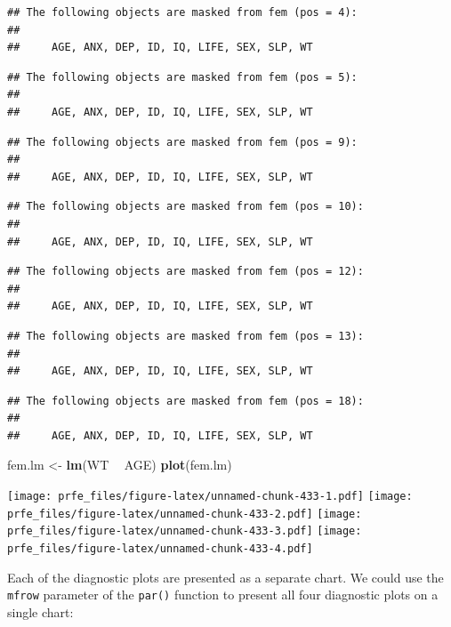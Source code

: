 \documentclass[12pt,a4paper]{book}
\newenvironment{Shaded}{\begin{snugshade}}{\end{snugshade}}
\newcommand{\KeywordTok}[1]{\textcolor[rgb]{0.13,0.29,0.53}{\textbf{#1}}}
\newcommand{\StringTok}[1]{\textcolor[rgb]{0.31,0.60,0.02}{#1}}
\newcommand{\OperatorTok}[1]{\textcolor[rgb]{0.81,0.36,0.00}{\textbf{#1}}}
\newcommand{\NormalTok}[1]{#1}
\theoremstyle{definition}
\theoremstyle{definition}
\theoremstyle{definition}
\theoremstyle{remark}
\begin{document}
\begin{verbatim}
## The following objects are masked from fem (pos = 4):
## 
##     AGE, ANX, DEP, ID, IQ, LIFE, SEX, SLP, WT
\end{verbatim}

\begin{verbatim}
## The following objects are masked from fem (pos = 5):
## 
##     AGE, ANX, DEP, ID, IQ, LIFE, SEX, SLP, WT
\end{verbatim}

\begin{verbatim}
## The following objects are masked from fem (pos = 9):
## 
##     AGE, ANX, DEP, ID, IQ, LIFE, SEX, SLP, WT
\end{verbatim}

\begin{verbatim}
## The following objects are masked from fem (pos = 10):
## 
##     AGE, ANX, DEP, ID, IQ, LIFE, SEX, SLP, WT
\end{verbatim}

\begin{verbatim}
## The following objects are masked from fem (pos = 12):
## 
##     AGE, ANX, DEP, ID, IQ, LIFE, SEX, SLP, WT
\end{verbatim}

\begin{verbatim}
## The following objects are masked from fem (pos = 13):
## 
##     AGE, ANX, DEP, ID, IQ, LIFE, SEX, SLP, WT
\end{verbatim}

\begin{verbatim}
## The following objects are masked from fem (pos = 18):
## 
##     AGE, ANX, DEP, ID, IQ, LIFE, SEX, SLP, WT
\end{verbatim}

\begin{Shaded}
\begin{Highlighting}[]
\NormalTok{fem.lm <-}\StringTok{ }\KeywordTok{lm}\NormalTok{(WT }\OperatorTok{~}\StringTok{ }\NormalTok{AGE)}
\KeywordTok{plot}\NormalTok{(fem.lm)}
\end{Highlighting}
\end{Shaded}

\texttt{[image: prfe\_files/figure-latex/unnamed-chunk-433-1.pdf]}
\texttt{[image: prfe\_files/figure-latex/unnamed-chunk-433-2.pdf]}
\texttt{[image: prfe\_files/figure-latex/unnamed-chunk-433-3.pdf]}
\texttt{[image: prfe\_files/figure-latex/unnamed-chunk-433-4.pdf]}

Each of the diagnostic plots are presented as a separate chart. We could
use the \texttt{mfrow} parameter of the \texttt{par()} function to
present all four diagnostic plots on a single chart:
\end{document}
